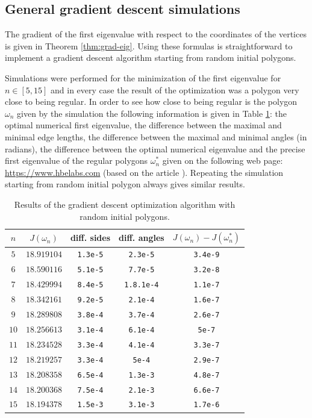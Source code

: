 \documentclass[JEP,XML,SOM,Unicode,ThmDefs,NoFloatCountersInSection,published]{cedram}
\theoremstyle{plain}
\theoremstyle{definition}
\begin{document}
\subsection{General gradient descent simulations}

The gradient of the first eigenvalue with respect to the coordinates of the vertices is given in Theorem \ref{thm:grad-eig}. Using these formulas is straightforward to implement a gradient descent algorithm starting from random initial polygons.

Simulations were performed for the minimization of the first eigenvalue for $n \in [5,15]$ and in every case the result of the optimization was a polygon very close to being regular. In order to see how close to being regular is the polygon $\omega_n$ given by the simulation the following information is given in Table \ref{tab:result-optim}: the optimal numerical first eigenvalue, the difference between the maximal and minimal edge lengths, the difference between the maximal and minimal angles (in radians), the difference between the optimal numerical eigenvalue and the precise first eigenvalue of the regular polygons $\omega_n^*$ given on the following web page: \url{https://www.hbelabs.com} (based on the article \cite{Jo17}). Repeating the simulation starting from random initial polygon always gives similar results.
\begin{table}[htb]
\smaller
\caption{Results of the gradient descent optimization algorithm with random initial polygons.}
\label{tab:result-optim}
\centering
\begin{tabular}{|c|c|c|c|c|}
\hline
$n$ & $J(\omega_n)$ & diff. sides & diff. angles & $J(\omega_n)-J(\omega_n^*)$ \\ \hline
$5$ & $18.919104$ & \texttt{1.3e-5} & \texttt{2.3e-5} & \texttt{3.4e-9} \\ \hline
$6$ & $18.590116$ & \texttt{5.1e-5} & \texttt{7.7e-5} & \texttt{3.2e-8} \\ \hline
$7$ & $18.429994$ & \texttt{8.4e-5} & \texttt{1.8.1e-4}& \texttt{1.1e-7} \\ \hline
$8$ & $18.342161$ & \texttt{9.2e-5} & \texttt{2.1e-4}& \texttt{1.6e-7} \\ \hline
$9$ & $18.289808$ & \texttt{3.8e-4} & \texttt{3.7e-4} & \texttt{2.6e-7} \\ \hline
$10$ & $18.256613$ & \texttt{3.1e-4} & \texttt{6.1e-4} & \texttt{5e-7} \\ \hline
$11$ & $18.234528$ & \texttt{3.3e-4} & \texttt{4.1e-4} & \texttt{3.3e-7} \\ \hline
$12$ & $18.219257$ & \texttt{3.3e-4} & \texttt{5e-4} & \texttt{2.9e-7} \\ \hline
$13$ & $18.208358$ & \texttt{6.5e-4} & \texttt{1.3e-3} & \texttt{4.8e-7} \\ \hline
$14$ & $18.200368$ & \texttt{7.5e-4} & \texttt{2.1e-3} & \texttt{6.6e-7} \\ \hline
$15$ & $18.194378$ & \texttt{1.5e-3} & \texttt{3.1e-3} & \texttt{1.7e-6} \\ \hline
\end{tabular}
\end{table}
\end{document}
